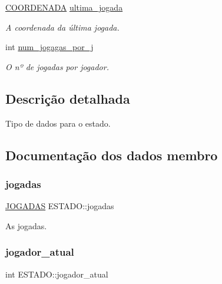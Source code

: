 \begin{DoxyCompactItemize}
\hyperlink{structCOORDENADA}{C\+O\+O\+R\+D\+E\+N\+A\+DA} \hyperlink{structESTADO_a4896a5c5c1f40b43fb795623327e3f47}{ultima\+\_\+jogada}
\begin{DoxyCompactList}\small\item\em A coordenada da última jogada. \end{DoxyCompactList}\item 
int \hyperlink{structESTADO_a3723f750e03d043ff72cececc0c3c391}{num\+\_\+jogagas\+\_\+por\+\_\+j}
\begin{DoxyCompactList}\small\item\em O nº de jogadas por jogador. \end{DoxyCompactList}\end{DoxyCompactItemize}


\subsection{Descrição detalhada}
Tipo de dados para o estado. 

\subsection{Documentação dos dados membro}
\mbox{\label{structESTADO_afae43b87a488fad0f2b56a18bad31d18}} 
\subsubsection{\texorpdfstring{jogadas}{jogadas}}
{\footnotesize\ttfamily \hyperlink{dados_8h_a94c221d29a1760f008b7834093259b7d}{J\+O\+G\+A\+D\+AS} E\+S\+T\+A\+D\+O\+::jogadas}



As jogadas. 

\mbox{\label{structESTADO_a5dd28e2e68b7aef2b6b7ea88e02eff58}} 
\subsubsection{\texorpdfstring{jogador\+\_\+atual}{jogador\_atual}}
{\footnotesize\ttfamily int E\+S\+T\+A\+D\+O\+::jogador\+\_\+atual}



